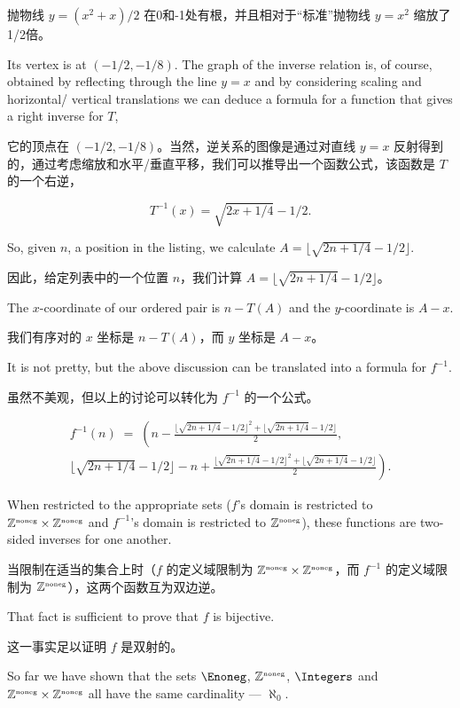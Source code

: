 抛物线 $y = (x^2 + x)/2$ 在0和-1处有根，并且相对于“标准”抛物线 $y = x^2$ 缩放了1/2倍。

Its vertex is at
$(-1/2,-1/8)$.  The graph of the inverse relation is, of course, obtained by
reflecting through the line $y = x$ and by considering scaling and horizontal/
vertical translations we can deduce a formula for a function that gives a
right inverse for $T$,

它的顶点在 $(-1/2,-1/8)$。当然，逆关系的图像是通过对直线 $y=x$ 反射得到的，通过考虑缩放和水平/垂直平移，我们可以推导出一个函数公式，该函数是 $T$ 的一个右逆，

\[ T^{-1}(x) = \sqrt{2x + 1/4} - 1/2.
\]

So, given $n$, a position in the listing, we calculate $A = \lfloor \sqrt{2n + 1/4}-1/2 \rfloor$.

因此，给定列表中的一个位置 $n$，我们计算 $A = \lfloor \sqrt{2n + 1/4}-1/2 \rfloor$。

The $x$-coordinate of our ordered pair is $n-T(A)$
and the $y$-coordinate is $A-x$.

我们有序对的 $x$ 坐标是 $n-T(A)$，而 $y$ 坐标是 $A-x$。

It is not pretty, but the above discussion can be translated into a formula
for $f^{-1}$.

虽然不美观，但以上的讨论可以转化为 $f^{-1}$ 的一个公式。

\begin{gather*}
    f^{-1}(n) \; = \;
    \left( n - \frac{ \lfloor \sqrt{2n + 1/4} - 1/2 \rfloor^2 + \lfloor \sqrt{2n + 1/4} - 1/2 \rfloor}{2} , \right. \\
    \left. \lfloor \sqrt{2n + 1/4} - 1/2  \rfloor - n + \frac{\lfloor \sqrt{2n + 1/4} - 1/2 \rfloor^2 + \lfloor \sqrt{2n + 1/4} - 1/2 \rfloor}{2} \right).
\end{gather*}

When restricted to the appropriate sets ($f$'s domain
is restricted to ${\mathbb Z}^{\mbox{\tiny noneg}} \times {\mathbb Z}^{\mbox{\tiny noneg}}$
and $f^{-1}$'s domain is restricted to ${\mathbb Z}^{\mbox{\tiny noneg}}$),
these functions are two-sided inverses
for one another.

当限制在适当的集合上时（$f$ 的定义域限制为 ${\mathbb Z}^{\mbox{\tiny noneg}} \times {\mathbb Z}^{\mbox{\tiny noneg}}$，而 $f^{-1}$ 的定义域限制为 ${\mathbb Z}^{\mbox{\tiny noneg}}$），这两个函数互为双边逆。

That fact is sufficient to prove that $f$
is bijective.

这一事实足以证明 $f$ 是双射的。

So far we have shown that the sets $\Enoneg$, ${\mathbb Z}^{\mbox{\tiny noneg}}$, $\Integers$ and
${\mathbb Z}^{\mbox{\tiny noneg}} \times {\mathbb Z}^{\mbox{\tiny noneg}}$ all have
the same cardinality ---  $\aleph_0$.

